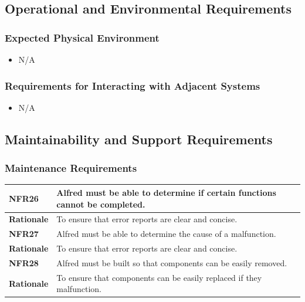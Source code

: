 \documentclass [11pt]{article}
\begin{document}
\subsection{Operational and Environmental Requirements}

\subsubsection{Expected Physical Environment }
	
	\begin{itemize}
		\item N/A
	\end{itemize}

\subsubsection{Requirements for Interacting with Adjacent Systems}
	
	\begin{itemize}
		\item N/A
	\end{itemize}


\pagebreak
\subsection{Maintainability and Support Requirements }

\subsubsection{Maintenance Requirements }

\begin{longtable}{| p{ } | p{ } | }\hline 
\rowcolor{tableCell}\textbf{NFR26} & Alfred must be able to determine if certain functions cannot be completed. \\ \hline
\textbf{Rationale} & To ensure that error reports are clear and concise. \\ \hline
\rowcolor{tableCell}\textbf{NFR27} & Alfred must be able to determine the cause of a malfunction.\\ \hline
\textbf{Rationale} & To ensure that error reports are clear and concise. \\ \hline
\rowcolor{tableCell}\textbf{NFR28} &  Alfred must be built so that components can be easily removed.\\ \hline \textbf{Rationale} & To ensure that components can be easily replaced if they malfunction.\\ \hline 
\end{longtable}
\end{document}
